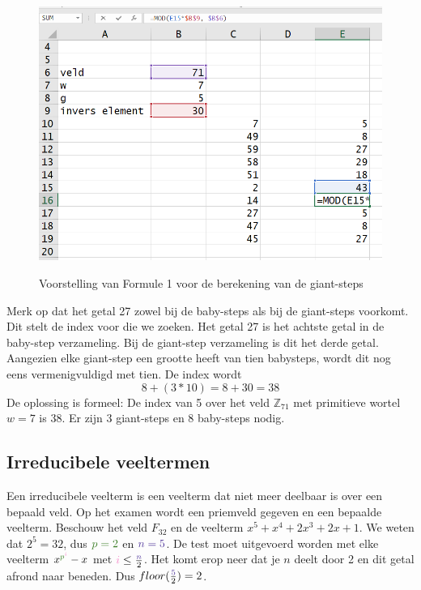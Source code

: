 \documentclass{article}
\def\acca#1{\color{OliveGreen} #1 \color{black}}
\def\accb#1{\color{Lavender} #1 \color{black}}
\def\accc#1{\color{Violet} #1 \color{black}}
\begin{document}
\begin{figure}
  \begin{center}
  \caption{Voorstelling van Formule 1 voor de berekening van de giant-steps}
  \includegraphics[width=\textwidth]{babystep_giantstep_3}
  \label{fig:babystep_giantstep_3}
  \end{center}
\end{figure}
  
Merk op dat het getal 27 zowel bij de baby-steps als bij de giant-steps voorkomt. Dit stelt de index voor die we zoeken. Het getal 27 is het achtste getal in de baby-step verzameling. Bij de giant-step verzameling is dit het derde getal. Aangezien elke giant-step een grootte heeft van tien babysteps, wordt dit nog eens vermenigvuldigd met tien. De index wordt $$8 + (3 * 10) = 8 + 30 = 38$$
De oplossing is formeel: De index van 5 over het veld $\mathbb{Z}_{71}$ met primitieve wortel $w = 7$ is 38. Er zijn 3 giant-steps en 8 baby-steps nodig.

\subsection{Irreducibele veeltermen}
Een irreducibele veelterm is een veelterm dat niet meer deelbaar is over een bepaald veld. Op het examen wordt een priemveld gegeven en een bepaalde veelterm. Beschouw het veld $F_{32}$ en de veelterm $x^5 + x^4 + 2x^3 + 2x + 1$. We weten dat $2^5 = 32$, dus $\acca{p = 2}$ en $\accc{n = 5}$. De test moet uitgevoerd worden met elke veelterm $x^{\acca{p}^{\accb{i}}} - x$ met $\accb{i} \leq \frac{\accc{n}}{2}$. Het komt erop neer dat je $n$ deelt door 2 en dit getal afrond naar beneden. Dus $floor(\frac{\accc{5}}{2}) = 2$. 
\end{document}
